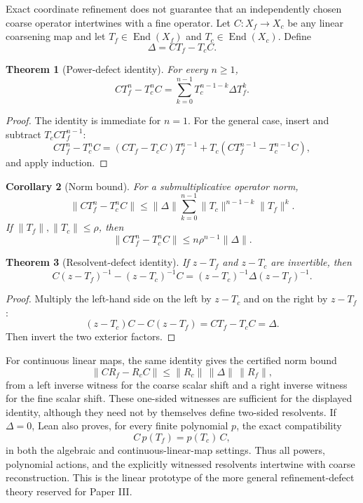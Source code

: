 \documentclass[11pt]{article}
\newtheorem{theorem}{Theorem}[section]
\newtheorem{corollary}[theorem]{Corollary}
\theoremstyle{definition}
\theoremstyle{remark}
\newcommand{\End}{\operatorname{End}}
\begin{document}
Exact coordinate refinement does not guarantee that an independently chosen
coarse operator intertwines with a fine operator. Let
$C:X_f\to X_c$ be any linear coarsening map and let
$T_f\in\End(X_f)$ and $T_c\in\End(X_c)$. Define
\[
\boxed{
\Delta=CT_f-T_cC.
}
\]

\begin{theorem}[Power-defect identity]\label{thm:power-defect}
For every $n\ge1$,
\[
\boxed{
CT_f^n-T_c^nC
=
\sum_{k=0}^{n-1}
T_c^{n-1-k}\Delta T_f^k.
}
\]
\end{theorem}

\begin{proof}
The identity is immediate for $n=1$. For the general case, insert and subtract $T_cCT_f^{n-1}$:
\[
CT_f^n-T_c^nC
=(CT_f-T_cC)T_f^{n-1}
+T_c(CT_f^{n-1}-T_c^{n-1}C),
\]
and apply induction.
\end{proof}

\begin{corollary}[Norm bound]\label{cor:defect-norm}
For a submultiplicative operator norm,
\[
\|CT_f^n-T_c^nC\|
\le
\|\Delta\|
\sum_{k=0}^{n-1}
\|T_c\|^{n-1-k}\|T_f\|^k.
\]
If $\|T_f\|,\|T_c\|\le\rho$, then
\[
\boxed{
\|CT_f^n-T_c^nC\|
\le n\rho^{n-1}\|\Delta\|.
}
\]
\end{corollary}

\begin{theorem}[Resolvent-defect identity]\label{thm:resolvent-defect}
If $z-T_f$ and $z-T_c$ are invertible, then
\[
\boxed{
C(z-T_f)^{-1}-(z-T_c)^{-1}C
=
(z-T_c)^{-1}\Delta(z-T_f)^{-1}.
}
\]
\end{theorem}

\begin{proof}
Multiply the left-hand side on the left by $z-T_c$ and on the right by $z-T_f$:
\[
(z-T_c)C-C(z-T_f)=CT_f-T_cC=\Delta.
\]
Then invert the two exterior factors.
\end{proof}

For continuous linear maps, the same identity gives the certified norm bound
\[
\boxed{
\|C R_f-R_c C\|
\le \|R_c\|\,\|\Delta\|\,\|R_f\|,
}
\]
from a left inverse witness for the coarse scalar shift and a right inverse
witness for the fine scalar shift. These one-sided witnesses are sufficient
for the displayed identity, although they need not by themselves define
two-sided resolvents. If $\Delta=0$, Lean also proves, for every finite
polynomial $p$, the exact compatibility
\[
\boxed{C\,p(T_f)=p(T_c)\,C,}
\]
in both the algebraic and continuous-linear-map settings. Thus all powers,
polynomial actions, and the explicitly witnessed resolvents intertwine with
coarse reconstruction. This is the linear prototype of the more general
refinement-defect theory reserved for Paper III.
\end{document}

